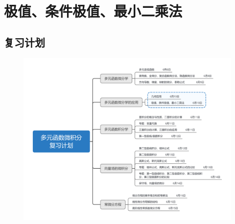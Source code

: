 \documentclass[12pt,UTF8]{ctexart}
\begin{document}
\setcounter{section}{4}
\section{极值、条件极值、最小二乘法}
\noindent
\subsection{复习计划}
\begin{figure}[H]
\begin{center}
\includegraphics[height=0.5\textheight]{Figures20190610/plan.png}
\end{center}
\end{figure}
\end{document}
